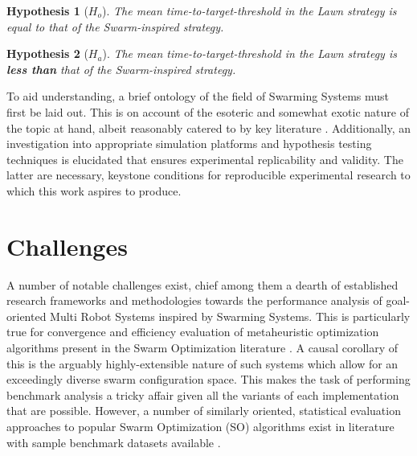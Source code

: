 \documentclass{report}
\newtheorem*{hyp}{Hypothesis}
\begin{document}
\begin{hyp}[$H_o$] \label{hyp:null}
	The mean \textit{time-to-target-threshold} in the Lawn strategy is \textit{equal} to that of the Swarm-inspired strategy.
\end{hyp}
\begin{hyp}[$H_a$] \label{hyp:alt}
	The mean \textit{time-to-target-threshold} in the Lawn strategy is \textbf{less than} that of the Swarm-inspired strategy.
\end{hyp}

To aid understanding, a brief ontology of the field of Swarming Systems must first be laid out. This is on account of the esoteric and somewhat exotic nature of the topic at hand, albeit reasonably catered to by key literature \cite{Beni2005a} \cite{Iocchi2001} \cite{Galceran2013}. Additionally, an investigation into appropriate simulation platforms and hypothesis testing techniques is elucidated that ensures experimental replicability and validity. The latter are necessary, keystone conditions for reproducible experimental research to which this work aspires to produce.

\section{Challenges}
A number of notable challenges exist, chief among them a dearth of established research frameworks and methodologies towards the performance analysis of goal-oriented Multi Robot Systems inspired by Swarming Systems. This is particularly true for convergence and efficiency evaluation of metaheuristic optimization algorithms present in the Swarm Optimization literature \cite{Yang2011}. A causal corollary of this is the arguably highly-extensible nature of such systems which allow for an exceedingly diverse swarm configuration space. This makes the task of performing benchmark analysis a tricky affair given all the variants of each implementation that are possible. However, a number of similarly oriented, statistical evaluation approaches to popular Swarm Optimization (SO) algorithms exist in literature \cite{Selvi2010} \cite{Yang2011} with sample benchmark datasets available \cite{Gerhard1991}.
\end{document}
